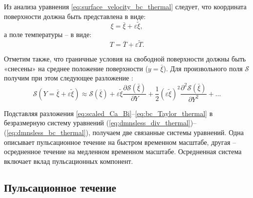 \documentclass[12pt,a4paper]{article}
\begin{document}
Из анализа уравнения \eqref{eq:surface_velocity_bc_thermal} следует, что координата поверхности должна быть представлена в виде:
\begin{equation}
	\xi = \bar{\xi} + \varepsilon \tilde{\xi},
	\label{eq:interface_expansion_thermal}
\end{equation}
а поле температуры -- в виде:
\begin{equation}
	T = \bar{T} + \varepsilon \tilde{T}.
	\label{eq:T_puls_averaged_expansion_thermal}
\end{equation}

Отметим также, что граничные условия на свободной поверхности
должны быть «снесены» на среднее положение поверхности ($y = \bar{\xi}$).
Для произвольного поля $\mathcal{S}$ получим при этом следующее разложение \cite{Shklyaev2008}:
\begin{equation}\label{eq:bc_Taylor_thermal}
	\mathcal{S}(Y = \bar{\xi} + \varepsilon \tilde{\xi})
	\approx
	\mathcal{S}(\bar{\xi})
	+
	\varepsilon \tilde{\xi}
	\frac{\partial \mathcal{S}(\bar{\xi})}{\partial Y}
	+
	\frac{1}{2}(\varepsilon \tilde{\xi})^2
	\frac{\partial^2 \mathcal{S}(\bar{\xi})}{\partial Y^2}
	+\ldots
\end{equation}


Подставляя разложения \eqref{eq:scaled_Ca_Bi}--\eqref{eq:bc_Taylor_thermal} в безразмерную систему уравнений (\ref{eq:dmnsless_div_thermal})--(\ref{eq:dmnsless_bc_thermal}), получаем две связанные системы уравнений. Одна описывает пульсационное течение на быстром временном масштабе, другая -- осредненное течение на медленном временном масштабе. Осредненная система включает вклад пульсационных компонент. 

\subsection{Пульсационное течение}
\end{document}
